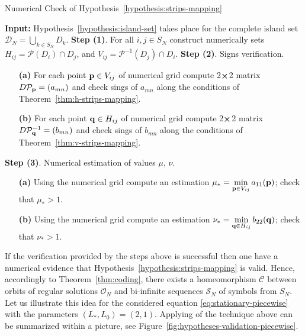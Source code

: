\begin{algorithm}[H]
\caption{Numerical Check of Hypothesis~\ref{hypothesis:strips-mapping}}
\label{algorithm:hypotheses-validation}
\begin{algorithmic}
	\STATE \textbf{Input:} Hypothesis~\ref{hypothesis:island-set} takes place for the complete island set $\mathcal{D}_N = \bigcup_{k \in S_N} D_k$.
	\STATE \textbf{Step (1)}. For all $i, j \in S_N$ construct numerically sets $H_{ij} = \mathcal{P}(D_i) \cap D_j$, and $V_{ij} = \mathcal{P}^{-1} (D_j) \cap D_i$.
	\STATE \textbf{Step (2)}. Signs verification.
	\STATE
	\begin{enumerate}
		\setlength{\itemsep}{1pt}
		\setlength{\parskip}{0pt}
  		\setlength{\parsep}{0pt}
		\item[\textbf{(a)}] For each point $\vb{p} \in V_{ij}$ of numerical grid compute 2$\cross$2 matrix $D \mathcal{P}_{\vb{p}} = (a_{mn})$ and check sings of $a_{mn}$ along the conditions of Theorem~\ref{thm:h-strips-mapping}.
		\item[\textbf{(b)}] For each point $\vb{q} \in H_{ij}$ of numerical grid compute 2$\cross$2 matrix $D \mathcal{P}_{\vb{q}}^{-1} = (b_{mn})$ and check sings of $b_{mn}$ along the conditions of Theorem~\ref{thm:v-strips-mapping}.
	\end{enumerate}
	\STATE \textbf{Step (3)}. Numerical estimation of values $\mu$, $\nu$.
	\STATE
	\begin{enumerate}
		\setlength{\itemsep}{1pt}
		\setlength{\parskip}{0pt}
  		\setlength{\parsep}{0pt}
		\item[\textbf{(a)}] Using the numerical grid compute an estimation $\mu_* = \min \limits_{\vb{p} \in V_{ij}} a_{11}(\vb{p})$; check that $\mu_* > 1$.
		\item[\textbf{(b)}] Using the numerical grid compute an estimation $\nu_* = \min \limits_{\vb{q} \in H_{ij}} b_{22}(\vb{q})$; check that $\nu_* > 1$.
	\end{enumerate}
\end{algorithmic}
\end{algorithm}

If the verification provided by the steps above is successful then one have a numerical evidence that Hypothesis~\ref{hypothesis:strips-mapping} is valid.
Hence, accordingly to Theorem~\ref{thm:coding}, there exists a homeomorphism $\mathcal{C}$ between orbits of regular solutions $\mathcal{O}_N$ and bi-infinite sequences $\mathcal{S}_N$ of symbols from $S_N$.
Let us illustrate this idea for the considered equation \eqref{eq:stationary-piecewise} with the parameters $(L_*, L_0) = (2, 1)$.
Applying of the technique above can be summarized within a picture, see Figure~\ref{fig:hypotheses-validation-piecewise}.

